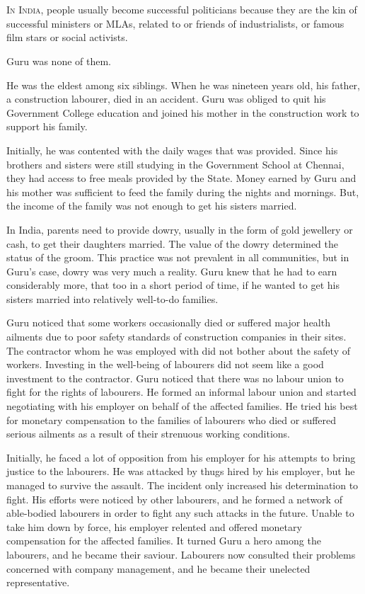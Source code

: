 \chapter{}

\lettrine{I}{n India}, people usually become successful politicians because they are the kin
of successful ministers or MLAs, related to or friends of industrialists, or famous
film stars or social activists.

Guru was none of them.

He was the eldest among six siblings. When he was nineteen years old, his
father, a construction labourer, died in an accident. Guru was obliged to quit
his Government College education and joined his mother in the construction work
to support his family.

Initially, he was contented with the daily wages that was provided. Since his
brothers and sisters were still studying in the Government School at Chennai,
they had access to free meals provided by the State. Money earned by Guru and
his mother was sufficient to feed the family during the nights and mornings.
But, the income of the family was not enough to get his sisters married.

In India, parents need to provide dowry, usually in the form of gold jewellery
or cash, to get their
daughters married. The value of the dowry determined the status of the groom.
This practice was not prevalent in all communities, but in Guru's case, dowry
was very much a reality. Guru knew that he had to earn considerably more, that
too in a short period of time, if he wanted to get his sisters married into
relatively well-to-do families.

Guru noticed that some workers occasionally died or suffered major health
ailments due to poor safety standards of construction companies in their sites. The
contractor whom he was employed with did not bother about the safety of workers.
Investing in the well-being of labourers did not seem like a good investment to
the contractor. Guru noticed that there was no labour union to fight for the
rights of labourers. He formed an informal labour union and started negotiating
with his employer on behalf of the affected families. He tried his best for
monetary compensation to the families of labourers who died or suffered serious
ailments as a result of their strenuous working conditions.

Initially, he faced a lot of opposition from his employer for his attempts to
bring justice to the labourers. He was attacked by thugs hired by his employer,
but he managed to survive the assault. The incident only increased his
determination to fight. His efforts were noticed by other labourers, and he formed
a network of able-bodied labourers in order to fight any such attacks in the
future. Unable to take him down by force, his employer relented and offered
monetary compensation for the affected families. It turned Guru a hero among the
labourers, and he became their saviour. Labourers now consulted their problems
concerned with company management, and he became their unelected representative.


